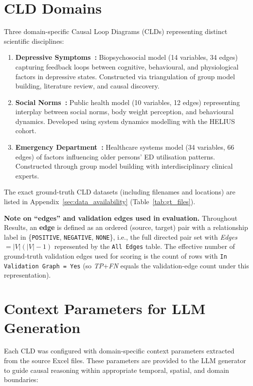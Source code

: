 \section{CLD Domains}
Three domain-specific Causal Loop Diagrams (CLDs) representing distinct scientific disciplines:
\begin{enumerate}[noitemsep]
    \item \textbf{Depressive Symptoms~\cite{uleman2024triangulation}:} Biopsychosocial model (14 variables, 34 edges) capturing feedback loops between cognitive, behavioural, and physiological factors in depressive states. Constructed via triangulation of group model building, literature review, and causal discovery.
    \item \textbf{Social Norms~\cite{crielaard2020socialnorms}:} Public health model (10 variables, 12 edges) representing interplay between social norms, body weight perception, and behavioural dynamics. Developed using system dynamics modelling with the HELIUS cohort.
    \item \textbf{Emergency Department~\cite{smeekes2023emergency}:} Healthcare systems model (34 variables, 66 edges) of factors influencing older persons' ED utilisation patterns. Constructed through group model building with interdisciplinary clinical experts.
\end{enumerate}
The exact ground-truth CLD datasets (including filenames and locations) are listed in Appendix~\ref{sec:data_availability} (Table~\ref{tab:gt_files}).

\noindent\textbf{Note on ``edges'' and validation edges used in evaluation.} Throughout Results, an \textbf{edge} is defined as an ordered (source, target) pair with a relationship label in \{\texttt{POSITIVE}, \texttt{NEGATIVE}, \texttt{NONE}\}, i.e., the full directed pair set with \textit{Edges} $=|V|(|V|-1)$ represented by the \texttt{All Edges} table. The effective number of ground-truth validation edges used for scoring is the count of rows with \texttt{In Validation Graph = Yes} (so \textit{TP}+\textit{FN} equals the validation-edge count under this representation).\par\smallskip

\section{Context Parameters for LLM Generation}

Each CLD was configured with domain-specific context parameters extracted from the source Excel files. These parameters are provided to the LLM generator to guide causal reasoning within appropriate temporal, spatial, and domain boundaries:


